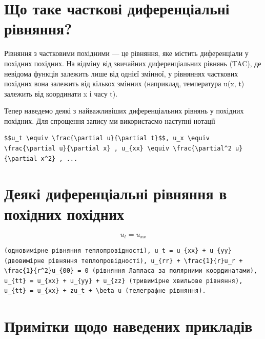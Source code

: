 \documentclass[
  ukrainian,
]{article}
\begin{document}
\section{Що таке часткові диференціальні
рівняння?}\label{ux449ux43e-ux442ux430ux43aux435-ux447ux430ux441ux442ux43aux43eux432ux456-ux434ux438ux444ux435ux440ux435ux43dux446ux456ux430ux43bux44cux43dux456-ux440ux456ux432ux43dux44fux43dux43dux44f}

Рівняння з частковими похідними --- це рівняння, яке містить
диференціали у похідних похідних. На відміну від звичайних
диференціальних рівнянь (TAC), де невідома функція залежить лише від
однієї змінної, у рівняннях часткових похідних вона залежить від кількох
змінних (наприклад, температура u(x, t) залежить від координати x і часу
t).

Тепер наведемо деякі з найважливіших диференціальних рівнянь у похідних
похідних. Для спрощення запису ми використаємо наступні нотації

\begin{verbatim}
$$u_t \equiv \frac{\partial u}{\partial t}$$, u_x \equiv \frac{\partial u}{\partial x} , u_{xx} \equiv \frac{\partial^2 u}{\partial x^2} , ...
\end{verbatim}

\section{Деякі диференціальні рівняння в похідних
похідних}\label{ux434ux435ux44fux43aux456-ux434ux438ux444ux435ux440ux435ux43dux446ux456ux430ux43bux44cux43dux456-ux440ux456ux432ux43dux44fux43dux43dux44f-ux432-ux43fux43eux445ux456ux434ux43dux438ux445-ux43fux43eux445ux456ux434ux43dux438ux445}

\[u_t = u_{xx}\]

\begin{verbatim}
(одновимірне рівняння теплопровідності), u_t = u_{xx} + u_{yy} (двовимірне рівняння теплопровідності), u_{rr} + \frac{1}{r}u_r + \frac{1}{r^2}u_{00} = 0 (рівняння Лапласа за полярними координатами), u_{tt} = u_{xx} + u_{yy} + u_{zz} (тривимірне хвильове рівняння), u_{tt} = u_{xx} + zu_t + \beta u (телеграфне рівняння).
\end{verbatim}

\section{Примітки щодо наведених
прикладів}\label{ux43fux440ux438ux43cux456ux442ux43aux438-ux449ux43eux434ux43e-ux43dux430ux432ux435ux434ux435ux43dux438ux445-ux43fux440ux438ux43aux43bux430ux434ux456ux432}
\end{document}
